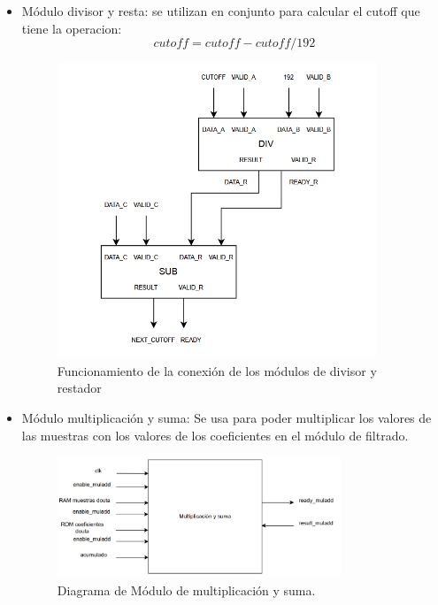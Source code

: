 \begin{itemize}
    \item Módulo divisor y resta: se utilizan en conjunto para calcular el cutoff que tiene la operacion:
    \[cutoff = cutoff - cutoff/192\]
    \begin{figure}[h!]
        \centering
        \includegraphics[width=0.9\textwidth]{./Images/img_implementacion_hw/DiagramaDivisorrestador.png}
        \caption{Funcionamiento de la conexión de los módulos de divisor y restador}
        \label{fig:divisorrestador}
    \end{figure}   
    \item Módulo multiplicación y suma: Se usa para poder multiplicar los valores de las muestras con los valores 
    de los coeficientes en el módulo de filtrado.
    \begin{figure}[h!]
        \centering
        \includegraphics[width=0.8\textwidth]{./Images/img_implementacion_hw/diagramamodulomultiplicacionysuma.png}
        \caption{Diagrama de Módulo de multiplicación y suma.}
        \label{fig:diagramamodulomultiplicacionysuma}
    \end{figure}
\end{itemize}


